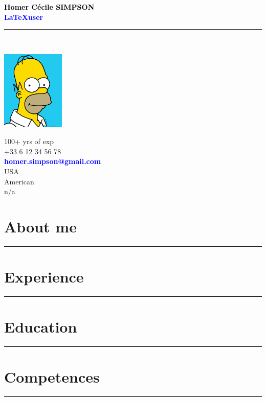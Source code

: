 \documentclass[11pt,A4]{article}
\begin{document}
\noindent\textcolor{black}{\large \bf Homer Cécile SIMPSON}\\
\textcolor{blue}{\large \bf \LaTeX \hspace{2mm}user }\vspace{5pt}\\
\noindent\textcolor{black}{\rule{\textwidth}{.8mm}}\\

\begin{minipage}[c]{0.3\textwidth}
\includegraphics[width=30mm]{photo}
\end{minipage}
\begin{minipage}[c]{0.35\textwidth}
\MineSign \hfill 100+ yrs of exp\\
\faPhone \hfill +33 6 12 34 56 78\\
\Letter \hfill \textcolor{blue}{\bf homer.simpson@gmail.com}\\
\faHome \hfill USA\\
\faFlag \hfill American\\
\faCar \hfill n/a\\
\end{minipage}

\section*{\hspace{0.5cm}About me}
\noindent\textcolor{black}{\rule{\textwidth}{.8mm}}
\lipsum[1]

\section*{\hspace{0.5cm}Experience}
\noindent\textcolor{black}{\rule{\textwidth}{.8mm}}
\lipsum[2]

\section*{\hspace{0.5cm}Education}
\noindent\textcolor{black}{\rule{\textwidth}{.8mm}}
\lipsum[3]

\section*{\hspace{0.5cm}Competences}
\noindent\textcolor{black}{\rule{\textwidth}{.8mm}}
\lipsum[4]
\end{document}
